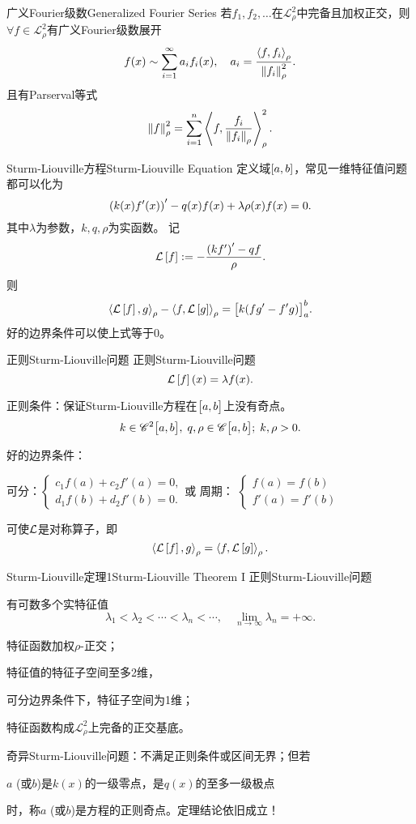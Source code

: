 \begin{theorem}{广义Fourier级数}{Generalized Fourier Series}
	若$f_1,f_2,\ldots$在$\mathscr L_\rho^2$中完备且加权正交，则$\forall f\in\mathscr L_\rho^2$有广义Fourier级数展开
	\[
		f(x)\sim\sum_{i=1}^\infty a_if_i(x),\quad a_i=\frac{\left\langle f,f_i\right\rangle_\rho}{\left\lVert f_i\right\rVert^2_\rho}.
	\]
	且有Parserval等式
	\[
		\left\lVert f\right\rVert_\rho^2=\sum_{i=1}^n\left\langle f,\frac{f_i}{\left\lVert f_i\right\rVert_\rho}\right\rangle_\rho^2.
	\]
\end{theorem}
\begin{definition}{Sturm-Liouville方程}{Sturm-Liouville Equation}
	定义域$\left[a,b\right]$，常见一维特征值问题都可以化为
	\[
		\left(k(x)f'(x)\right)'-q(x)f(x)+\lambda\rho(x)f(x)=0.
	\]
	其中$\lambda$为参数，$k,q,\rho$为实函数。
	记
	\[
		\mathcal L\left[f\right]:=-\frac{\left(kf'\right)'-qf}\rho.
	\]
	则
	\[
		\left\langle \mathcal L\left[f\right],g\right\rangle_\rho-\left\langle f,\mathcal L\left[g\right]\right\rangle_\rho=\bigl[k(fg'-f'g)\bigr]_a^b.
	\]
	好的边界条件可以使上式等于0。
\end{definition}
\begin{definition}{正则Sturm-Liouville问题}{}
    正则Sturm-Liouville问题
    \[
    	\mathcal L\left[f\right](x)=\lambda f(x).
    \]
    
    正则条件：保证Sturm-Liouville方程在$\bigl[a,b\bigr]$上没有奇点。
    \[
    	k\in\mathscr C^2\bigl[a,b\bigr],\;q,\rho\in\mathscr C\bigl[a,b\bigr];\;k,\rho>0.
    \]
    
    
    好的边界条件：
    \begin{center}
    	可分：$\begin{cases}
    			c_1f(a)+c_2f'(a)=0, \\
    			d_1f(b)+d_2f'(b)=0.
    		\end{cases}$\quad 或 \quad 周期：
    	$\begin{cases}
    			f(a)=f(b) \\
    			f'(a)=f'(b)
    		\end{cases}$
    \end{center}
    可使$\mathcal L$是对称算子，即
    \[
    	\left\langle \mathcal L\left[f\right],g\right\rangle_\rho=\left\langle f,\mathcal L\left[g\right]\right\rangle_\rho.
    \]
\end{definition}
\begin{theorem}{Sturm-Liouville定理1}{Sturm-Liouville Theorem I}
	正则Sturm-Liouville问题
	\begin{compactenum}
		\item 有可数多个实特征值
		      \[
				\lambda_1<\lambda_2<\cdots<\lambda_n<\cdots,\quad\lim_{n\to\infty}\lambda_n=+\infty.
			  \]
		\item 特征函数加权$\rho$\;-\;正交；
		\item 特征值的特征子空间至多2维，

		      可分边界条件下，特征子空间为1维；
		\item 特征函数构成$\mathscr L_\rho^2$上完备的正交基底。
	\end{compactenum}
    \tcblower
    奇异Sturm-Liouville问题：不满足正则条件或区间无界；但若
    \begin{center}
        $a$ (或$b$)是$k(x)$的一级零点，是$q(x)$的至多一级极点 
    \end{center}
    时，称$a$ (或$b$)是方程的正则奇点。定理结论依旧成立！
\end{theorem}
